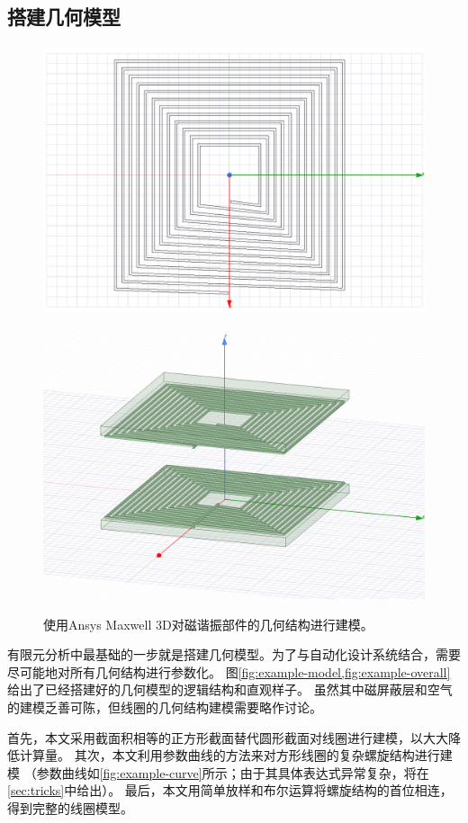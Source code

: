 \documentclass[index]{subfiles}
\begin{document}
\subsection{搭建几何模型}
\begin{figure}[p]
  \centering%
    {\includegraphics[width=0.85\linewidth]{./figures/example-curve.png}}\par
    {\includegraphics[width=0.85\linewidth]{./figures/example-overall.png}}
  \caption[几何模型的搭建]{使用Ansys Maxwell 3D对磁谐振部件的几何结构进行建模。}
\end{figure}
有限元分析中最基础的一步就是搭建几何模型。为了与自动化设计系统结合，需要尽可能地对所有几何结构进行参数化。
图\cref{fig:example-model,fig:example-overall}给出了已经搭建好的几何模型的逻辑结构和直观样子。
虽然其中磁屏蔽层和空气的建模乏善可陈，但线圈的几何结构建模需要略作讨论。

首先，本文采用截面积相等的正方形截面替代圆形截面对线圈进行建模，以大大降低计算量。
其次，本文利用参数曲线的方法来对方形线圈的复杂螺旋结构进行建模
（参数曲线如\cref{fig:example-curve}所示；由于其具体表达式异常复杂，将在\cref{sec:tricks}中给出）。
最后，本文用简单放样和布尔运算将螺旋结构的首位相连，得到完整的线圈模型。
\end{document}
